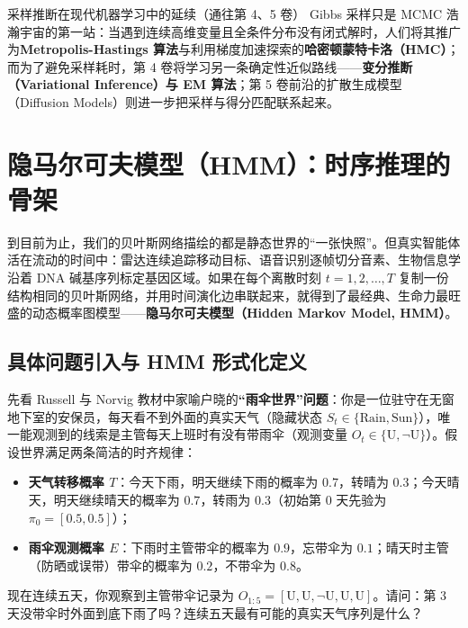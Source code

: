 \begin{insightBox}{采样推断在现代机器学习中的延续（通往第 4、5 卷）}
Gibbs 采样只是 MCMC 浩瀚宇宙的第一站：当遇到连续高维变量且全条件分布没有闭式解时，人们将其推广为\textbf{Metropolis-Hastings 算法}与利用梯度加速探索的\textbf{哈密顿蒙特卡洛（HMC）}；而为了避免采样耗时，第 4 卷将学习另一条确定性近似路线——\textbf{变分推断（Variational Inference）与 EM 算法}；第 5 卷前沿的扩散生成模型（Diffusion Models）则进一步把采样与得分匹配联系起来。
\end{insightBox}

\section{隐马尔可夫模型（HMM）：时序推理的骨架}\label{sec:hmm}

到目前为止，我们的贝叶斯网络描绘的都是静态世界的“一张快照”。但真实智能体活在流动的时间中：雷达连续追踪移动目标、语音识别逐帧切分音素、生物信息学沿着 DNA 碱基序列标定基因区域。如果在每个离散时刻 $t = 1, 2, \dots, T$ 复制一份结构相同的贝叶斯网络，并用时间演化边串联起来，就得到了最经典、生命力最旺盛的动态概率图模型——\textbf{隐马尔可夫模型（Hidden Markov Model, HMM）}。

\subsection{具体问题引入与 HMM 形式化定义}

先看 Russell 与 Norvig 教材中家喻户晓的\textbf{“雨伞世界”问题}：你是一位驻守在无窗地下室的安保员，每天看不到外面的真实天气（隐藏状态 $S_t \in \{\text{Rain}, \text{Sun}\}$），唯一能观测到的线索是主管每天上班时有没有带雨伞（观测变量 $O_t \in \{\text{U}, \neg\text{U}\}$）。假设世界满足两条简洁的时齐规律：
\begin{itemize}
  \item \textbf{天气转移概率 $T$}：今天下雨，明天继续下雨的概率为 $0.7$，转晴为 $0.3$；今天晴天，明天继续晴天的概率为 $0.7$，转雨为 $0.3$（初始第 $0$ 天先验为 $\pi_0 = [0.5, 0.5]$）；
  \item \textbf{雨伞观测概率 $E$}：下雨时主管带伞的概率为 $0.9$，忘带伞为 $0.1$；晴天时主管（防晒或误带）带伞的概率为 $0.2$，不带伞为 $0.8$。
\end{itemize}
现在连续五天，你观察到主管带伞记录为 $O_{1:5} = [\text{U}, \text{U}, \neg\text{U}, \text{U}, \text{U}]$。请问：第 3 天没带伞时外面到底下雨了吗？连续五天最有可能的真实天气序列是什么？

